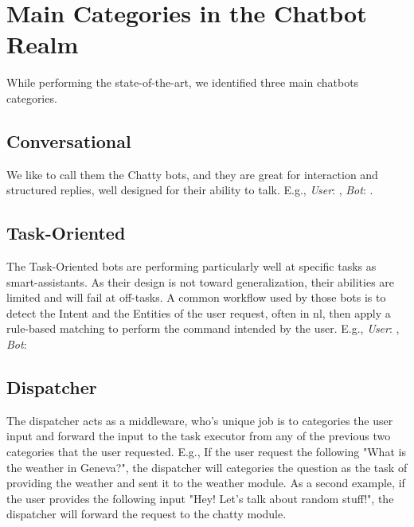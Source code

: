 \section{Main Categories in the Chatbot Realm}
\label{chatbot:main-cats}
While performing the state-of-the-art, we identified three main chatbots categories. 

\subsection{Conversational}
We like to call them the Chatty bots, and they are great for interaction and structured replies, well designed for their ability to talk. E.g., \textit{User}: , \textit{Bot}: .

\subsection{Task-Oriented}
The Task-Oriented bots are performing particularly well at specific tasks as smart-assistants. As their design is not toward generalization, their abilities are limited and will fail at off-tasks. A common workflow used by those bots is to detect the Intent and the Entities of the user request, often in \gls{nl}, then apply a rule-based matching to perform the command intended by the user. E.g., \textit{User}: , \textit{Bot}: 

\subsection{Dispatcher}
The dispatcher acts as a middleware, who's unique job is to categories the user input and forward the input to the task executor from any of the previous two categories that the user requested. E.g., If the user request the following "What is the weather in Geneva?", the dispatcher will categories the question as the task of providing the weather and sent it to the weather module. As a second example, if the user provides the following input "Hey! Let's talk about random stuff!", the dispatcher will forward the request to the chatty module.



